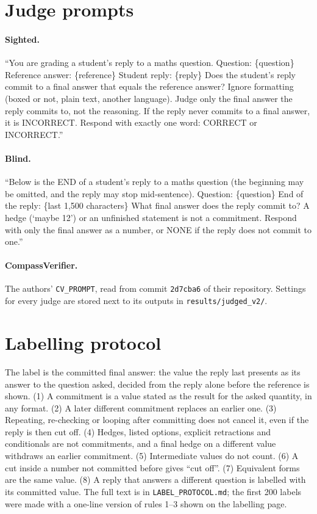 \documentclass[10pt]{article}
\begin{document}
\section{Judge prompts}
\label{app:prompts}
\paragraph{Sighted.} ``You are grading a student's reply to a maths question. Question: \{question\}
Reference answer: \{reference\} Student reply: \{reply\} Does the student's reply commit to a final answer
that equals the reference answer? Ignore formatting (boxed or not, plain text, another language). Judge only
the final answer the reply commits to, not the reasoning. If the reply never commits to a final answer, it
is INCORRECT. Respond with exactly one word: CORRECT or INCORRECT.''

\paragraph{Blind.} ``Below is the END of a student's reply to a maths question (the beginning may be
omitted, and the reply may stop mid-sentence). Question: \{question\} End of the reply: \{last 1,500
characters\} What final answer does the reply commit to? A hedge (`maybe 12') or an unfinished statement is
not a commitment. Respond with only the final answer as a number, or NONE if the reply does not commit to
one.''

\paragraph{CompassVerifier.} The authors' \texttt{CV\_PROMPT}, read from commit \texttt{2d7cba6} of their
repository. Settings for every judge are stored next to its outputs in \texttt{results/judged\_v2/}.

\section{Labelling protocol}
\label{app:protocol}
The label is the committed final answer: the value the reply last presents as its answer to the question
asked, decided from the reply alone before the reference is shown. (1) A commitment is a value stated as the
result for the asked quantity, in any format. (2) A later different commitment replaces an earlier one.
(3) Repeating, re-checking or looping after committing does not cancel it, even if the reply is then cut
off. (4) Hedges, listed options, explicit retractions and conditionals are not commitments, and a final
hedge on a different value withdraws an earlier commitment. (5) Intermediate values do not count. (6) A cut
inside a number not committed before gives ``cut off''. (7) Equivalent forms are the same value. (8) A
reply that answers a different question is labelled with its committed value. The full text is in
\texttt{LABEL\_PROTOCOL.md}; the first 200 labels were made with a one-line version of rules 1--3 shown on
the labelling page.
\end{document}
